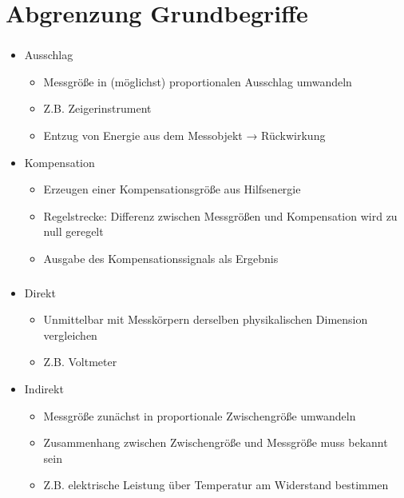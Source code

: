 \section{Abgrenzung Grundbegriffe}

\begin{frame}
    \frametitle{\insertsection}
    \begin{itemize}
        \item Ausschlag
        \begin{itemize}
            \item Messgröße in (möglichst) proportionalen Ausschlag umwandeln
            \item Z.B. Zeigerinstrument
            \item Entzug von Energie aus dem Messobjekt → Rückwirkung
        \end{itemize}
        \item Kompensation
        \begin{itemize}
            \item Erzeugen einer Kompensationsgröße aus Hilfsenergie
            \item Regelstrecke: Differenz zwischen Messgrößen und Kompensation wird zu null geregelt
            \item Ausgabe des Kompensationssignals als Ergebnis
        \end{itemize}
    \end{itemize}
\end{frame}

\begin{frame}
    \frametitle{\insertsection}
    \begin{itemize}
        \item Direkt
        \begin{itemize}
            \item Unmittelbar mit Messkörpern derselben physikalischen Dimension vergleichen
            \item Z.B. Voltmeter
        \end{itemize}
        \item Indirekt
        \begin{itemize}
            \item Messgröße zunächst in proportionale Zwischengröße umwandeln
            \item Zusammenhang zwischen Zwischengröße und Messgröße muss bekannt sein
            \item Z.B. elektrische Leistung über Temperatur am Widerstand bestimmen
        \end{itemize}
    \end{itemize}
\end{frame}

